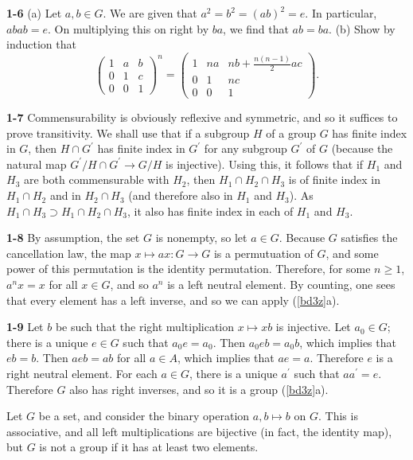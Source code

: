 \documentclass[a4paper,11pt,final,openany]{memoir}%
\theoremstyle{nonumberplain}
\begin{document}
\bigskip\noindent\textbf{1-6}
(a) Let $a,b\in G$. We are given that $a^{2}=b^{2}=(ab)^{2}=e$. In particular,
$abab=e$. On multiplying this on right by $ba$, we find that $ab=ba$. (b) Show
by induction that
\[%
\begin{pmatrix}
1 & a & b\\
0 & 1 & c\\
0 & 0 & 1
\end{pmatrix}
^{n}=%
\begin{pmatrix}
1 & na & nb+\frac{n(n-1)}{2}ac\\
0 & 1 & nc\\
0 & 0 & 1
\end{pmatrix}
.
\]

\bigskip\noindent\textbf{1-7}
Commensurability is obviously reflexive and symmetric, and so it suffices to
prove transitivity. We shall use that if a subgroup $H$ of a group $G$ has
finite index in $G$, then $H\cap G^{\prime}$ has finite index in $G^{\prime}$
for any subgroup $G^{\prime}$ of $G$ (because the natural map $G^{\prime
}/H\cap G^{\prime}\rightarrow G/H$ is injective). Using this, it follows that
if $H_{1}$ and $H_{3}$ are both commensurable with $H_{2}$, then $H_{1}\cap
H_{2}\cap H_{3}$ is of finite index in $H_{1}\cap H_{2}$ and in $H_{2}\cap
H_{3}$ (and therefore also in $H_{1}$ and $H_{3}$). As $H_{1}\cap H_{3}\supset
H_{1}\cap H_{2}\cap H_{3}$, it also has finite index in each of $H_{1}$ and
$H_{3}$.

\bigskip\noindent\textbf{1-8}
By assumption, the set $G$ is nonempty, so let $a\in G$. Because $G$ satisfies
the cancellation law, the map $x\mapsto ax\colon G\rightarrow G$ is a
permutuation of $G$, and some power of this permutation is the identity
permutation. Therefore, for some $n\geq1$, $a^{n}x=x$ for all $x\in G$, and so
$a^{n}$ is a left neutral element. By counting, one sees that every element
has a left inverse, and so we can apply (\ref{bd3z}a).

\bigskip\noindent\textbf{1-9}
Let $b$ be such that the right multiplication $x\mapsto xb$ is injective. Let
$a_{0}\in G$;  there is a unique $e\in G$ such that $a_{0}e=a_{0}$. Then
$a_{0}eb=a_{0}b$, which implies that $eb=b$. Then $aeb=ab$ for all $a\in A$,
which implies that $ae=a$. Therefore $e$ is a right neutral element.  For each
$a\in G$, there is a unique $a^{\prime}$ such that $aa^{\prime}=e$.
Therefore $G$ also has right inverses, and so it is a group (\ref{bd3z}a).\par
Let $G$ be a set, and consider the binary operation $a,b\mapsto b$ on $G$.
This is associative, and all left multiplications are bijective (in fact, the
identity map), but $G$ is not a group if it has at least two elements.
\end{document}
